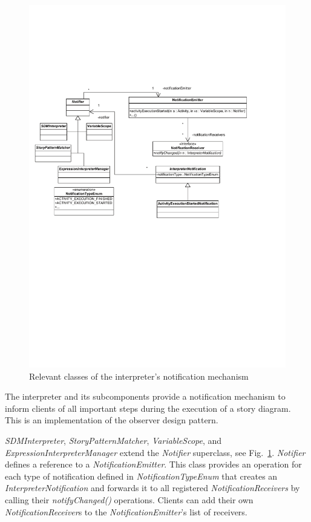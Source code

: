 \begin{figure}[htbp]
\includegraphics[width=1.0\columnwidth]{figures/interpreter_notification.pdf} 
\caption{Relevant classes of the interpreter's notification mechanism}
\label{fig:sdm_interpreter_notification}
\end{figure}

The interpreter and its subcomponents provide a notification mechanism to inform clients of all important steps during the execution of a story diagram.
This is an implementation of the observer design pattern.

\emph{SDMInterpreter}, \emph{StoryPatternMatcher}, \emph{VariableScope}, and \emph{ExpressionInterpreterManager} extend the \emph{Notifier} superclass, see Fig.~\ref{fig:sdm_interpreter_notification}.
\emph{Notifier} defines a reference to a \emph{NotificationEmitter}. 
This class provides an operation for each type of notification defined in \emph{NotificationTypeEnum} that creates an \emph{InterpreterNotification} and forwards it to all registered \emph{NotificationReceivers} by calling their \emph{notifyChanged()} operations. 
Clients can add their own \emph{NotificationReceiver}s to the \emph{NotificationEmitter}'s list of receivers.

